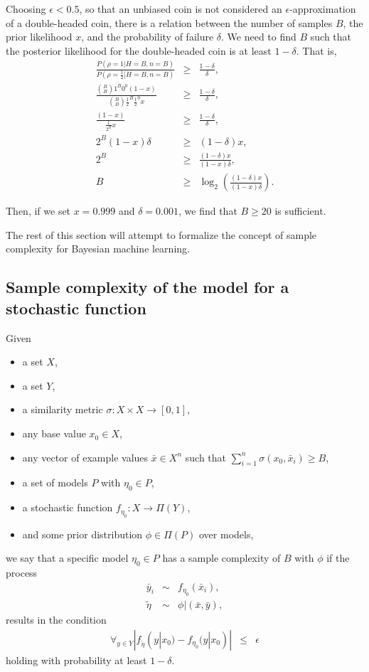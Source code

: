 \begin{example}
Choosing $\epsilon<0.5$, so that an unbiased coin is not considered an $\epsilon$-approximation of a double-headed coin, there is a relation between the number of samples $B$, the prior likelihood $x$, and the probability of failure $\delta$. We need to find $B$ such that the posterior likelihood for the double-headed coin is at least $1-\delta$. That is,
\begin{eqnarray}
\frac
 {P(\rho=1|H=B,n=B)}
 {P(\rho=\frac{1}{2}|H=B,n=B)}
&\geq&
\frac
 {1-\delta}
 {\delta},\\
\frac
 {{B \choose B}1^B0^0 (1-x)} 
 {{B \choose B}{\frac{1}{2}}^B{\frac{1}{2}}^0 x}
&\geq&
\frac
 {1-\delta}
 {\delta},\\
\frac
 {(1-x)} 
 {{\frac{1}{2^B}} x}
&\geq&
\frac
 {1-\delta}
 {\delta},\\
 2^B(1-x)\delta 
 &\geq&
 (1-\delta)x,\\
 2^B 
 &\geq&
\frac
 {(1-\delta)x}
 {(1-x)\delta},\\
%
B &\geq& \log_2\left(\frac
 {(1-\delta)x}
 {(1-x)\delta}
 \right).
\end{eqnarray}

Then, if we set $x=0.999$ and $\delta=0.001$, we find that $B\geq20$ is sufficient.


\end{example}

The rest of this section will attempt to formalize the concept of sample complexity for Bayesian machine learning.

\subsection{Sample complexity of the model for a stochastic function}

Given
\begin{itemize}
\item a set $X$,
\item a set $Y$,
\item a similarity metric $\sigma:X\times X\rightarrow[0,1]$,
\item any base value $x_0\in X$,
\item any vector of example values $\bar x \in X^n$ such that $\sum_{i=1}^n \sigma(x_0, \bar x_i) \geq B$,
\item a set of models $P$ with $\eta_0 \in P$,
\item a stochastic function $f_{\eta_0}:X\rightarrow\Pi(Y)$,
\item and some prior distribution $\phi \in \Pi(P)$ over models,
\end{itemize}
we say that a specific model $\eta_0 \in P$ has a sample complexity of $B$ with $\phi$ if the process
\begin{eqnarray}
\bar y_i &\sim& f_{\eta_0}(\bar x_i),\\
\tilde\eta &\sim& \phi|(\bar x, \bar y),
\end{eqnarray}
results in the condition
\begin{eqnarray}
\forall_{y\in Y}|f_{\tilde\eta}(y|x_0)-f_{\eta_0}(y|x_0)| &\leq& \epsilon
\end{eqnarray}
holding with probability at least $1-\delta$.

